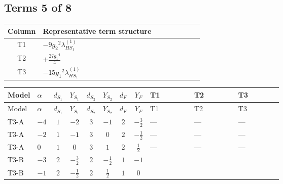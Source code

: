 \documentclass[8pt]{article}
\begin{document}
\begin{landscape}
\subsection*{Terms 5 of 8}
\begin{center}
\begin{tabular}{@{}c >{\raggedright\arraybackslash}p{0.82\linewidth}@{}}
\toprule
Column & Representative term structure \\
\midrule
T1 & \(\displaystyle -9 {g_2}^2 {\lambda_{HS_1}^{(1)}}\) \\
\midrule
T2 & \(\displaystyle +\frac{27 {g_1}^4}{4}\) \\
\midrule
T3 & \(\displaystyle -15 {g_1}^2 {\lambda_{HS_1}^{(1)}}\) \\
\midrule
\bottomrule
\end{tabular}
\end{center}
\smallskip
\tiny
\begin{longtable}{@{}llcccccc >{\raggedright\arraybackslash}p{0.21\linewidth} >{\raggedright\arraybackslash}p{0.21\linewidth} >{\raggedright\arraybackslash}p{0.21\linewidth}@{}}
\toprule
Model & $\alpha$ & $d_{S_1}$ & $Y_{S_1}$ & $d_{S_2}$ & $Y_{S_2}$ & $d_F$ & $Y_F$ & T1 & T2 & T3 \\
\midrule
\endfirsthead
\toprule
Model & $\alpha$ & $d_{S_1}$ & $Y_{S_1}$ & $d_{S_2}$ & $Y_{S_2}$ & $d_F$ & $Y_F$ & T1 & T2 & T3 \\
\midrule
\endhead
T3-A & $-4$ & $1$ & $-2$ & $3$ & $-1$ & $2$ & $-\frac{3}{2}$ & --- & --- & --- \\
\midrule
T3-A & $-2$ & $1$ & $-1$ & $3$ & $0$ & $2$ & $-\frac{1}{2}$ & --- & --- & --- \\
\midrule
T3-A & $0$ & $1$ & $0$ & $3$ & $1$ & $2$ & $\frac{1}{2}$ & --- & --- & --- \\
\midrule
T3-B & $-3$ & $2$ & $-\frac{3}{2}$ & $2$ & $-\frac{1}{2}$ & $1$ & $-1$ & \scriptsize\adjustbox{max width=\linewidth}{$\begin{gathered} -9 {g_2}^2 {\lambda_{HS_1}^{(1)}}\end{gathered}$} & \scriptsize\adjustbox{max width=\linewidth}{$\begin{gathered} +\frac{27 {g_1}^4}{4}\end{gathered}$} & \scriptsize\adjustbox{max width=\linewidth}{$\begin{gathered} -15 {g_1}^2 {\lambda_{HS_1}^{(1)}}\end{gathered}$} \\
\midrule
T3-B & $-1$ & $2$ & $-\frac{1}{2}$ & $2$ & $\frac{1}{2}$ & $1$ & $0$ & \scriptsize\adjustbox{max width=\linewidth}{$\begin{gathered} -9 {g_2}^2 {\lambda_{HS_1}^{(1)}}\end{gathered}$} & \scriptsize\adjustbox{max width=\linewidth}{$\begin{gathered} +\frac{3 {g_1}^4}{4}\end{gathered}$} & \scriptsize\adjustbox{max width=\linewidth}{$\begin{gathered} -3 {g_1}^2 {\lambda_{HS_1}^{(1)}}\end{gathered}$} \\

\end{longtable}
\end{landscape}
\end{document}
